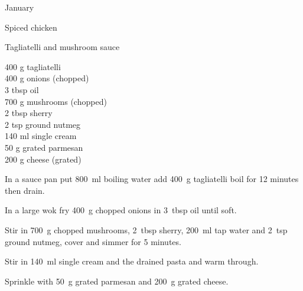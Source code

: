 \begin{menu}{January}
\begin{recipe}{2}{Spiced chicken}
\begin{instructions}
    \end{instructions}
    \end{recipe}%
  
    \begin{recipe}{2}{Tagliatelli and mushroom sauce}%
		\begin{ingredients}
		400 g tagliatelli  \\
	400 g onions (chopped) \\
	3 tbsp oil  \\
	700 g mushrooms (chopped) \\
	2 tbsp sherry  \\
	2 tsp ground nutmeg  \\
	140 ml single cream  \\
	50 g grated parmesan  \\
	200 g cheese (grated) \\
	
		\end{ingredients}
	
    \begin{instructions}
    \item 
      In a
      sauce pan
      put
      800~ml  boiling water
      add
      400~g  tagliatelli
      boil for 12 minutes then drain.
    \item 
        In a large wok fry
        400~g chopped onions
        in
        3~tbsp  oil
        until soft.
      \item 
        Stir in
        700~g chopped mushrooms,
        2~tbsp  sherry,
        200~ml  tap water
        and
        2~tsp  ground nutmeg,
        cover and simmer for 5 minutes.
      \item 
        Stir in
        140~ml  single cream
        and the drained pasta
        and warm through.
      \item 
        Sprinkle with
        50~g  grated parmesan
        and
        200~g grated cheese.
      
    \end{instructions}
    \end{recipe}%
  

\end{menu}
